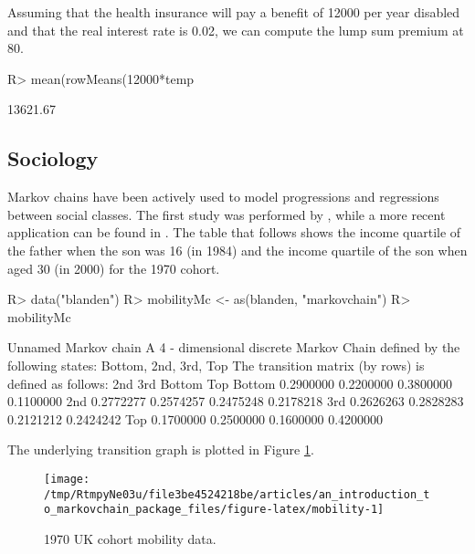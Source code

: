 \documentclass[article,nojss]{jss}
\begin{document}
Assuming that the health insurance will pay a benefit of 12000 per year disabled and that the real interest rate is 0.02, we can compute the lump sum premium at 80.

\begin{CodeChunk}

\begin{CodeInput}
R> mean(rowMeans(12000*temp%
\end{CodeInput}

\begin{CodeOutput}
[1] 13621.67
\end{CodeOutput}
\end{CodeChunk}

\hypertarget{app:sociology}{%
\subsection{Sociology}\label{app:sociology}}

Markov chains have been actively used to model progressions and regressions between social classes. The first study was performed by \cite{glassHall}, while a more recent application can be found in \cite{blandenEtAlii}. The table that follows shows the income quartile of the father when the son was 16 (in 1984) and the income quartile of the son when aged 30 (in 2000) for the 1970 cohort.

\begin{CodeChunk}

\begin{CodeInput}
R> data("blanden")
R> mobilityMc <- as(blanden, "markovchain")
R> mobilityMc
\end{CodeInput}

\begin{CodeOutput}
Unnamed Markov chain 
 A  4 - dimensional discrete Markov Chain defined by the following states: 
 Bottom, 2nd, 3rd, Top 
 The transition matrix  (by rows)  is defined as follows: 
             2nd       3rd    Bottom       Top
Bottom 0.2900000 0.2200000 0.3800000 0.1100000
2nd    0.2772277 0.2574257 0.2475248 0.2178218
3rd    0.2626263 0.2828283 0.2121212 0.2424242
Top    0.1700000 0.2500000 0.1600000 0.4200000
\end{CodeOutput}
\end{CodeChunk}

The underlying transition graph is plotted in Figure \ref{fig:mobility}.

\begin{CodeChunk}
\begin{figure}

{\centering \texttt{[image: /tmp/RtmpyNe03u/file3be4524218be/articles/an\_introduction\_to\_markovchain\_package\_files/figure-latex/mobility-1]} 

}

\caption[1970 UK cohort mobility data]{1970 UK cohort mobility data.}\label{fig:mobility}
\end{figure}
\end{CodeChunk}
\end{document}
